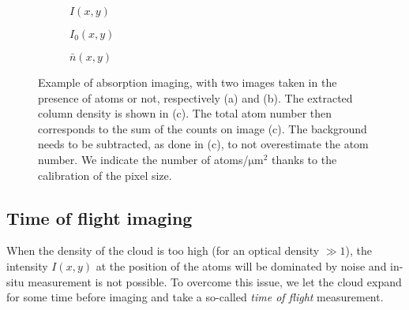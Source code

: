 \documentclass[11pt]{article}
\numberwithin{equation}{section}
\numberwithin{figure}{section}
\begin{document}
%
\begin{figure}[htbp]
	\centering
	\hspace{-1cm}
	\begin{subfigure}[b]{0.32\textwidth}
		\centering
		\small
		
		\caption{\small $I(x, y)$}
		\label{fig:I}
	\end{subfigure}
	\begin{subfigure}[b]{0.32\textwidth}
		\centering
		\small
		
		\caption{\small $I_0(x, y)$}
		\label{fig:I_0}
	\end{subfigure}
	\begin{subfigure}[b]{0.32\textwidth}
    	\centering
    	\small
		
		\vspace{-0.65cm}
		\caption{\small $\bar{n}(x, y)$}
		\label{fig:column_density}
	\end{subfigure}	
	\caption{\small Example of absorption imaging, with two images taken in the presence of atoms or not, respectively (a) and (b). The extracted column density is shown in (c). The total atom number then corresponds to the sum of the counts on image (c). The background needs to be subtracted, as done in (c), to not overestimate the atom number. We indicate the number of atoms/$\si{\micro\metre\squared}$ thanks to the calibration of the pixel size.}
    \label{fig:absorption_imaging}
\end{figure}
%

\subsection{Time of flight imaging}
 
When the density of the cloud is too high (for an optical density $\gg 1$), the intensity $I(x,y)$ at the position of the atoms will be dominated by noise and in-situ measurement is not possible. To overcome this issue, we let the cloud expand for some time before imaging and take a so-called \emph{time of flight} measurement. \\
\end{document}
